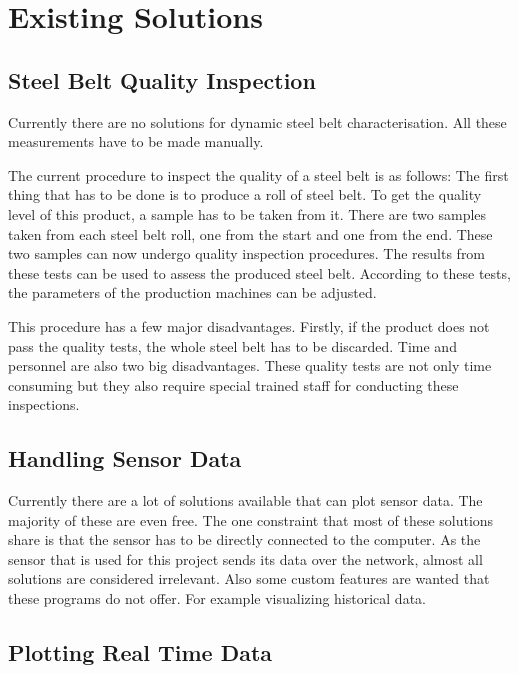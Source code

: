 \section{Existing Solutions}

\subsection{Steel Belt Quality Inspection}

Currently there are no solutions for dynamic steel belt characterisation. All these measurements have to be made manually.

The current procedure to inspect the quality of a steel belt is as follows: The first thing that has to be done is to produce a roll of steel belt. To get the quality level of this product, a sample has to be taken from it. There are two samples taken from each steel belt roll, one from the start and one from the end. These two samples can now undergo quality inspection procedures. The results from these tests can be used to assess the produced steel belt. According to these tests, the parameters of the production machines can be adjusted.

This procedure has a few major disadvantages. Firstly, if the product does not pass the quality tests, the whole steel belt has to be discarded. Time and personnel are also two big disadvantages. These quality tests are not only time consuming but they also require special trained staff for conducting these inspections.

\subsection{Handling Sensor Data}

Currently there are a lot of solutions available that can plot sensor data. The majority of these are even free. The one constraint that most of these solutions share is that the sensor has to be directly connected to the computer. As the sensor that is used for this project sends its data over the network, almost all solutions are considered irrelevant. Also some custom features are wanted that these programs do not offer. For example visualizing historical data.

\subsection{Plotting Real Time Data}


